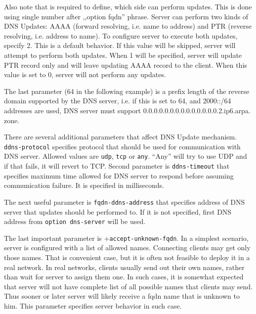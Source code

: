 Also note that is required to define, which side can perform updates.
This is done using single number after ,,option fqdn'' phrase. Server
can perform two kinds of DNS Updates: AAAA (forward resolving,
i.e. name to address) and PTR (reverse resolving, i.e. address to
name). To configure server to execute both updates, specify 2. This is
a default behavior. If this value will be skipped, server will attempt
to perform both updates. When 1 will be specified, server will update
PTR record only and will leave updating AAAA record to the
client. When this value is set to 0, server will not perform any
updates.

The last parameter (64 in the following example) is a prefix length of
the reverse domain supported by the DNS server, i.e. if this is set to
64, and 2000::/64 addresses are used, DNS server must support
0.0.0.0.0.0.0.0.0.0.0.0.0.0.2.ip6.arpa. zone.

There are several additional parameters that affect DNS Update
mechanism. \verb+ddns-protocol+ specifies protocol that should be used
for communication with DNS server.  Allowed values
are \verb+udp+, \verb+tcp+ or \verb+any+. ``Any'' will try to use UDP
and if that fails, it will revert to TCP. Second parameter
is \verb+ddns-timeout+ that specifies maximum time allowed for DNS
server to respond before assuming communication failure. It is
specified in milliseconds.

The next useful parameter is \verb+fqdn-ddns-address+ that specifies
address of DNS server that updates should be performed to. If it is
not specified, first DNS address from \verb+option dns-server+ will be
used.

The last important parameter is +\verb+accept-unknown-fqdn+. In a
simplest scenario, server is configured with a list of allowed
names. Connecting clients may get only those names. That is convenient
case, but it is often not feasible to deploy it in a real network.  In
real networks, clients usually send out their own names, rather than
wait for server to assign them one. In such cases, it is somewhat
expected that server will not have complete list of all possible names
that clients may send. Thus sooner or later server will likely receive
a fqdn name that is unknown to him. This parameter specifies server
behavior in such case.

